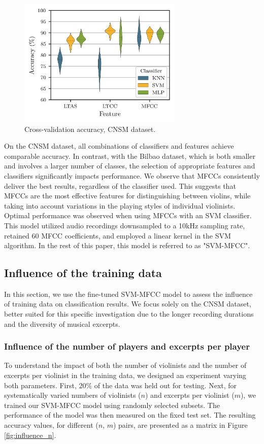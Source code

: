 \documentclass[11pt]{article}
\begin{document}
\begin{figure}[!ht]
  \centerline{
      \includegraphics[width=7.8cm]{figures/accuracy-cnsm.png}
  }
  \caption{Cross-validation accuracy, CNSM dataset.}
  \label{fig:accuracy-cnsm}
\end{figure}

\noindent On the CNSM dataset, all combinations of classifiers and features achieve comparable accuracy. In contrast, with the Bilbao dataset, which is both smaller and involves a larger number of classes, the selection of appropriate features and classifiers significantly impacts performance.
We observe that MFCCs consistently deliver the best results, regardless of the classifier used. This suggests that MFCCs are the most effective features for distinguishing between violins, while taking into account variations in the playing styles of individual violinists.
Optimal performance was observed when using MFCCs with an SVM classifier. This model utilized audio recordings downsampled to a 10kHz sampling rate, retained $60$ MFCC coefficients, and employed a linear kernel in the SVM algorithm. In the rest of this paper, this model is referred to as "SVM-MFCC".

\subsection{Influence of the training data}
In this section, we use the fine-tuned SVM-MFCC model to assess the influence of training data on classification results. We focus solely on the CNSM dataset, better suited for this specific investigation due to the longer recording durations and the diversity of musical excerpts.

\subsubsection{Influence of the number of players and excerpts per player}
To understand the impact of both the number of violinists and the number of excerpts per violinist in the training data, we designed an experiment varying both parameters.  First, $20\%$ of the data was held out for testing.  Next, for systematically varied numbers of violinists ($n$) and excerpts per violinist ($m$), we trained our SVM-MFCC model using randomly selected subsets. The performance of the model was then measured on the fixed test set. The resulting accuracy values, for different ($n$, $m$) pairs, are presented as a matrix in Figure \ref{fig:influence_n}.
\end{document}
